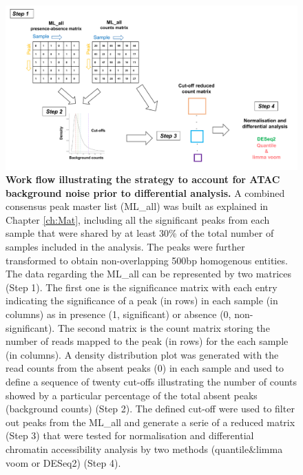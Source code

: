 \begin{landscape}
\begin{figure}[htbp]
\centering
\includegraphics[width=1.2\textwidth]{./Results1/pdfs/ATAC_master_list_filtering_flow_chart}
\caption[Work flow illustrating the strategy to account for ATAC background noise prior to differential analysis.]{\textbf{Work flow illustrating the strategy to account for ATAC background noise prior to differential analysis.} A combined consensus peak master list (ML\_all) was built as explained in Chapter \ref{ch:Mat}, including all the significant peaks from each sample that were shared by at least 30\% of the total number of samples included in the analysis. The peaks were further transformed to obtain non-overlapping 500bp homogenous entities. The data regarding the ML\_all can be represented by two matrices (Step 1). The first one is the significance matrix with each entry indicating the significance of a peak (in rows) in each sample (in columns) as in presence (1, significant) or absence (0, non-significant). The second matrix is the count matrix storing the number of reads mapped to the peak (in rows) for the each sample (in columns). A density distribution plot was generated with the read counts from the absent peaks (0) in each sample and used to define a sequence of twenty cut-offs illustrating the number of counts showed by a particular percentage of the total absent peaks (background counts) (Step 2). The defined cut-off were used to filter out peaks from the ML\_all and generate a serie of a reduced matrix (Step 3) that were tested for normalisation and differential chromatin accessibility analysis by two methods (quantile\&limma voom or DESeq2) (Step 4).}
\label{figure:ML_workflow}
\end{figure}
\end{landscape}



